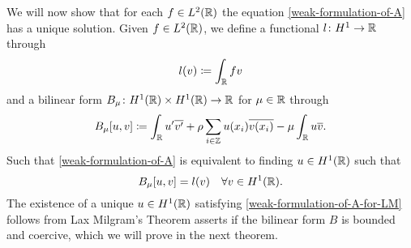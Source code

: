 We will now show that for each $f \in L^{2}(\mathbb{R})$ the equation \eqref{weak-formulation-of-A} has a unique solution. Given $f \in L^{2}(\mathbb{R})$, we define a functional $l \colon H^{1} \rightarrow \mathbb{R}$ through
	\[ l(v) \coloneqq \int_{\mathbb{R}} f v \]
and a bilinear form $B_{\mu} \colon H^{1}(\mathbb{R}) \times H^{1}(\mathbb{R}) \rightarrow \mathbb{R}$ for $\mu \in \mathbb{R}$ through
	\[ B_{\mu}[u, v] \coloneqq \int_{\mathbb{R}} u' \overline{v'} + \rho \sum_{i \in \mathbb{Z}} u(x_{i}) \overline{v(x_{i})} - \mu \int_{\mathbb{R}} u \overline{v}. \]
Such that \eqref{weak-formulation-of-A} is equivalent to finding $u \in H^{1}(\mathbb{R})$ such that
	\begin{equation}
		B_{\mu}[u, v] =  l(v) \quad \forall v \in H^{1}(\mathbb{R}). \label{weak-formulation-of-A-for-LM}
	\end{equation}
The existence of a unique $u \in H^{1}(\mathbb{R})$ satisfying \eqref{weak-formulation-of-A-for-LM} follows from Lax Milgram's Theorem asserts if the bilinear form $B$ is bounded and coercive, which we will prove in the next theorem. %

